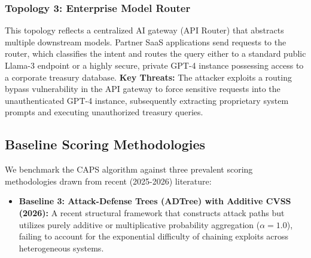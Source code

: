 \subsubsection{Topology 3: Enterprise Model Router}
This topology reflects a centralized AI gateway (API Router) that abstracts multiple downstream models. Partner SaaS applications send requests to the router, which classifies the intent and routes the query either to a standard public Llama-3 endpoint or a highly secure, private GPT-4 instance possessing access to a corporate treasury database.
\textbf{Key Threats:} The attacker exploits a routing bypass vulnerability in the API gateway to force sensitive requests into the unauthenticated GPT-4 instance, subsequently extracting proprietary system prompts and executing unauthorized treasury queries.

\subsection{Baseline Scoring Methodologies}
We benchmark the CAPS algorithm against three prevalent scoring methodologies drawn from recent (2025-2026) literature:

\begin{itemize}
    \item \textbf{Baseline 3: Attack-Defense Trees (ADTree) with Additive CVSS (2026):} A recent structural framework \cite{nagaraja2026llmbasedsystemsbreaksystemlevel} that constructs attack paths but utilizes purely additive or multiplicative probability aggregation ($\alpha = 1.0$), failing to account for the exponential difficulty of chaining exploits across heterogeneous systems.
\end{itemize}

